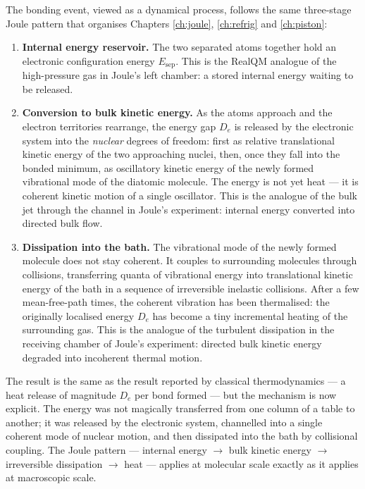 The bonding event, viewed as a dynamical process, follows the same
three-stage Joule pattern that organises Chapters \ref{ch:joule},
\ref{ch:refrig} and \ref{ch:piston}:

\begin{enumerate}
\item \textbf{Internal energy reservoir.} The two separated atoms together
hold an electronic configuration energy $E_{\mathrm{sep}}$. This is the
RealQM analogue of the high-pressure gas in Joule's left chamber: a stored
internal energy waiting to be released.

\item \textbf{Conversion to bulk kinetic energy.} As the atoms approach and
the electron territories rearrange, the energy gap $D_e$ is released by the
electronic system into the \emph{nuclear} degrees of freedom: first as
relative translational kinetic energy of the two approaching nuclei, then,
once they fall into the bonded minimum, as oscillatory kinetic energy of
the newly formed vibrational mode of the diatomic molecule. The energy is
not yet heat --- it is coherent kinetic motion of a single oscillator. This
is the analogue of the bulk jet through the channel in Joule's experiment:
internal energy converted into directed bulk flow.

\item \textbf{Dissipation into the bath.} The vibrational mode of the
newly formed molecule does not stay coherent. It couples to surrounding
molecules through collisions, transferring quanta of vibrational energy
into translational kinetic energy of the bath in a sequence of irreversible
inelastic collisions. After a few mean-free-path times, the coherent
vibration has been thermalised: the originally localised energy $D_e$ has
become a tiny incremental heating of the surrounding gas. This is the
analogue of the turbulent dissipation in the receiving chamber of Joule's
experiment: directed bulk kinetic energy degraded into incoherent thermal
motion.
\end{enumerate}

The result is the same as the result reported by classical thermodynamics
--- a heat release of magnitude $D_e$ per bond formed --- but the mechanism
is now explicit. The energy was not magically transferred from one column
of a table to another; it was released by the electronic system, channelled
into a single coherent mode of nuclear motion, and then dissipated into the
bath by collisional coupling. The Joule pattern --- internal energy
$\to$ bulk kinetic energy $\to$ irreversible dissipation $\to$ heat ---
applies at molecular scale exactly as it applies at macroscopic scale.

